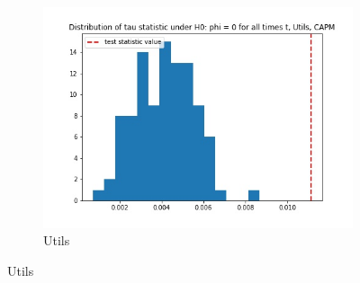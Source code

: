 \documentclass{article}
\begin{document}
\begin{figure}
\begin{subfigure}[b]{0.5\textwidth}
    \includegraphics[width=\textwidth]{Utils/tau_hist_02_CAPM.jpg}
    \caption{Utils}
    \label{fig:2}
  \end{subfigure}
\end{figure}

\newpage
\end{document}
